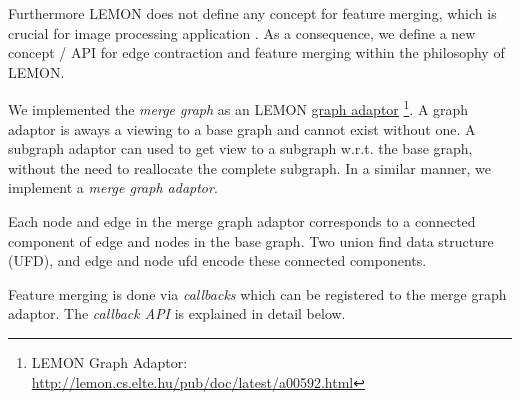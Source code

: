 Furthermore LEMON does not define any concept for feature merging, which
is crucial for image processing application \citep{arbelaez_2006_cvpr}.
As a consequence, we define a new concept / API for 
edge contraction and feature merging within the philosophy of LEMON.

We implemented the \emph{merge graph} as an LEMON  \href{http://lemon.cs.elte.hu/pub/doc/latest/a00592.html}{graph adaptor}
\footnote{ LEMON Graph Adaptor: \url{http://lemon.cs.elte.hu/pub/doc/latest/a00592.html} }.
A graph adaptor is aways a viewing to a base graph and cannot exist without one.
A subgraph adaptor can used to get view to a subgraph w.r.t. the base graph, without
the need to reallocate the complete subgraph.
In a similar manner, we implement a \emph{merge graph adaptor}.

Each node and edge in the merge graph adaptor corresponds to a connected component of 
edge and nodes in the base graph.
Two union find data structure (UFD), and edge and node ufd encode these connected components.

Feature merging is done via \emph{callbacks} which can be registered to the merge graph adaptor.
The \emph{callback API} is explained in detail below. 


